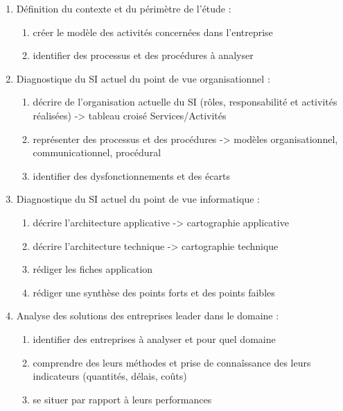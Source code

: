 \begin{enumerate}
          \begin{enumerate}
            \item Définition du contexte et du périmètre de l'étude :
                \begin{enumerate}
                  \item créer le modèle des activités concernées dans l'entreprise
                  \item  identifier des processus et des procédures à analyser
                \end{enumerate}
            \item Diagnostique du SI actuel du point de vue organisationnel : 
                \begin{enumerate}
                  \item décrire de l'organisation actuelle du SI (rôles, responsabilité et activités réalisées) -> tableau croisé Services/Activités 
                  \item représenter des processus et des procédures -> modèles organisationnel, communicationnel, procédural 
                  \item identifier des dysfonctionnements et des écarts
                \end{enumerate}
            \item Diagnostique du SI actuel du point de vue informatique : 
                \begin{enumerate}
                  \item décrire l'architecture applicative -> cartographie applicative
                  \item décrire l'architecture technique -> cartographie technique 
                  \item rédiger les fiches application
                  \item rédiger une synthèse des points forts et des points faibles
                \end{enumerate}
            \item Analyse des solutions des entreprises leader dans le domaine : 
                \begin{enumerate}
                  \item identifier des entreprises à analyser et pour quel domaine 
                  \item comprendre des leurs méthodes et prise de connaîssance des leurs indicateurs (quantités, délais, coûts) 
                  \item se situer par rapport à leurs performances

\end{enumerate}
\end{enumerate}
\end{enumerate}
